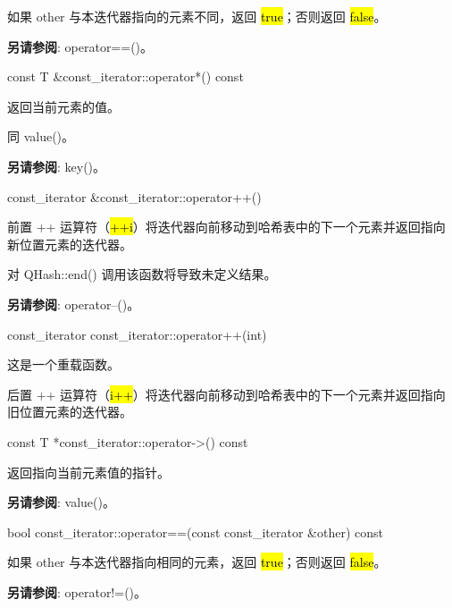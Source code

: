 如果 other 与本迭代器指向的元素不同，返回 \hl{true}；否则返回 \hl{false}。

\textbf{另请参阅}: operator==()。

const T \&const\_iterator::operator*() const

返回当前元素的值。

同 value()。

\textbf{另请参阅}: key()。

const\_iterator \&const\_iterator::operator++()

前置 ++ 运算符（\hl{++i}）将迭代器向前移动到哈希表中的下一个元素并返回指向新位置元素的迭代器。

对 QHash::end() 调用该函数将导致未定义结果。

\textbf{另请参阅}: operator--()。

const\_iterator const\_iterator::operator++(int)

这是一个重载函数。

后置 ++ 运算符（\hl{i++}）将迭代器向前移动到哈希表中的下一个元素并返回指向
旧位置元素的迭代器。

const T *const\_iterator::operator->() const

返回指向当前元素值的指针。

\textbf{另请参阅}: value()。

bool const\_iterator::operator==(const const\_iterator \&other) const

如果 other 与本迭代器指向相同的元素，返回 \hl{true}；否则返回 \hl{false}。

\textbf{另请参阅}: operator!=()。



